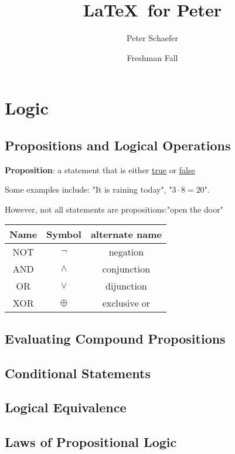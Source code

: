 \documentclass{article}
\title{\LaTeX\ for Peter}
\author{Peter Schaefer}
\date{Freshman Fall}
\begin{document}
\maketitle

\tableofcontents

\newpage

\section{Logic}
\subsection{Propositions and Logical Operations}

\textbf{Proposition}: a statement that is either \underline{true} or \underline{false}

Some examples include: "It is raining today",  "\(3 \cdot 8 = 20 \)".

However, not all statements are propositions:"open the door"

{}
\begin{flushright}
  \begin{tabular}{|c|c|c|}
    \hline
    \textbf{Name} & \textbf{Symbol} & \textbf{alternate name} \\
    \hline
    NOT & $\lnot$ & negation \\
    AND & $\land$ & conjunction \\
    OR & $\lor$ & dijunction \\
    XOR & $\oplus$ & exclusive or \\
    \hline
  \end{tabular}
\end{flushright}
  
\subsection{Evaluating Compound Propositions}
\subsection{Conditional Statements}
\subsection{Logical Equivalence}
\subsection{Laws of Propositional Logic}
\end{document}

